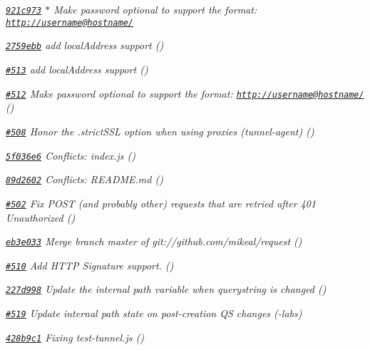 \begin{DoxyItemize}
\item {\itshape \href{https://github.com/mikeal/request/commit/921c973015721ee0f92ed670f5e88bca057104cc}{\tt 921c973} $\ast$ Make password optional to support the format\+: \href{http://username@hostname/}{\tt http\+://username@hostname/}}
\item {\itshape \href{https://github.com/mikeal/request/commit/2759ebbe07e8563fd3ded698d2236309fb28176b}{\tt 2759ebb} add \textquotesingle{}local\+Address\textquotesingle{} support ()}
\item {\itshape \href{https://github.com/mikeal/request/pull/513}{\tt \#513} add \textquotesingle{}local\+Address\textquotesingle{} support ()}
\item {\itshape \href{https://github.com/mikeal/request/pull/512}{\tt \#512} Make password optional to support the format\+: \href{http://username@hostname/}{\tt http\+://username@hostname/} ()}
\item {\itshape \href{https://github.com/mikeal/request/pull/508}{\tt \#508} Honor the .strict\+S\+S\+L option when using proxies (tunnel-\/agent) ()}
\item {\itshape \href{https://github.com/mikeal/request/commit/5f036e6f5d3102a89e5401a53090a0627a7850a8}{\tt 5f036e6} Conflicts\+: index.\+js ()}
\item {\itshape \href{https://github.com/mikeal/request/commit/89d2602ef4e3a4e6e51284f6a29b5767c79ffaba}{\tt 89d2602} Conflicts\+: R\+E\+A\+D\+M\+E.\+md ()}
\item {\itshape \href{https://github.com/mikeal/request/pull/502}{\tt \#502} Fix P\+O\+S\+T (and probably other) requests that are retried after 401 Unauthorized ()}
\item {\itshape \href{https://github.com/mikeal/request/commit/eb3e033170403832fe7070955db32112ec46005f}{\tt eb3e033} Merge branch \textquotesingle{}master\textquotesingle{} of git\+://github.com/mikeal/request ()}
\item {\itshape \href{https://github.com/mikeal/request/pull/510}{\tt \#510} Add H\+T\+T\+P Signature support. ()}
\item {\itshape \href{https://github.com/mikeal/request/commit/227d9985426214b6ac68702933346000298d7790}{\tt 227d998} Update the internal path variable when querystring is changed ()}
\item {\itshape \href{https://github.com/mikeal/request/pull/519}{\tt \#519} Update internal path state on post-\/creation Q\+S changes (-\/labs)}
\item {\itshape \href{https://github.com/mikeal/request/commit/428b9c1ad9831b7dfd6cec4ce68df358590c6d65}{\tt 428b9c1} Fixing test-\/tunnel.\+js ()}

\end{DoxyItemize}
